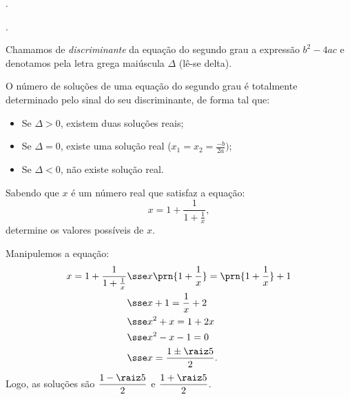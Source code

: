\begin{onlineact}
	.
\end{onlineact}

\begin{onlineact}
	.
\end{onlineact}

\begin{definition}
	Chamamos de \emph{discriminante} da equação do segundo grau a expressão $b^2 - 4ac$ e denotamos pela letra grega maiúscula $\Delta$ (lê-se delta).
\end{definition}

\begin{remark}
	O número de soluções de uma equação do segundo grau é totalmente determinado pelo sinal do seu discriminante, de forma tal que:
	\begin{itemize}
		\item Se $\Delta > 0$, existem duas soluções reais;
		\item Se $\Delta = 0 $, existe uma solução real ($x_1 = x_2 = \frac{-b}{2a})$;
		\item Se $\Delta < 0$, não existe solução real.
	\end{itemize}
\end{remark}

\begin{example}
	Sabendo que $x$ é um número real que satisfaz a equação:
	\[
		x = 1 + \frac 1 {1 + \frac 1 x},
	\]
	determine os valores possíveis de $x$.
\end{example}

\begin{solution}
	Manipulemos a equação:
	\begin{align*}
		x = 1 + \dfrac 1 {1 + \frac 1 x} & \sse x \prn{1 + \dfrac 1 x } = \prn{ 1 + \dfrac 1 x }+1 \\
										 & \sse x + 1 = \dfrac 1 x + 2 \\
										 & \sse x^2 + x = 1 + 2x \\
										 & \sse x^2 - x - 1 = 0 \\
										 & \sse x = \dfrac{1 \pm\raiz 5} 2.
	\end{align*}
	Logo, as soluções são $\dfrac {1 - \raiz 5} 2$ e $\dfrac { 1 + \raiz 5 } 2$.
\end{solution}

